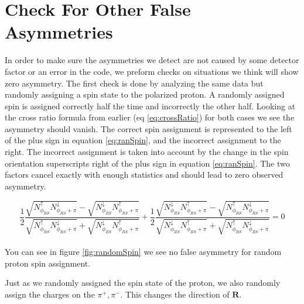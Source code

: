 \documentclass[abstract = on,listof=totoc, bibliography=totoc]{scrreprt}
\newcommand{\pip}{\pi^+}
\newcommand{\pim}{\pi^-}
\begin{document}
\section{Check For Other False Asymmetries}
In order to make sure the asymmetries we detect are not caused by some detector factor or an error in the code, we preform checks on situations we think will show zero asymmetry. The first check is done by analyzing the same data but randomly assigning a spin state to the polarized proton. A randomly assigned spin is assigned correctly half the time and incorrectly the other half. Looking at the cross ratio formula from earlier (eq \ref{eq:crossRatio}) for both cases we see the asymmetry should vanish. The correct spin assignment is represented to the left of the plus sign in equation \ref{eq:ranSpin}, and the incorrect assignment to the right. The incorrect assignment is taken into account by the change in the spin orientation superscripts right of the plus sign in equation \ref{eq:ranSpin}. The two factors cancel exactly with enough statistics and should lead to zero observed asymmetry. 

    

 
\begin{equation}
\label{eq:ranSpin}
\frac{1}{2}\frac{\sqrt{N^\uparrow_{\phi_{RS}}N^\downarrow_{\phi_{RS}+\pi}} - \sqrt{N^\downarrow_{\phi_{RS}}N^\uparrow_{\phi_{RS}+\pi}}}{\sqrt{N^\uparrow_{\phi_{RS}}N^\downarrow_{\phi_{RS}+\pi}} + \sqrt{N^\downarrow_{\phi_{RS}}N^\uparrow_{\phi_{RS}+\pi}}}
+
\frac{1}{2}\frac{\sqrt{N^\downarrow_{\phi_{RS}}N^\uparrow_{\phi_{RS}+\pi}} - \sqrt{N^\uparrow_{\phi_{RS}}N^\downarrow_{\phi_{RS}+\pi}}}{\sqrt{N^\downarrow_{\phi_{RS}}N^\uparrow_{\phi_{RS}+\pi}} + \sqrt{N^\uparrow_{\phi_{RS}}N^\downarrow_{\phi_{RS}+\pi}}} = 0
\end{equation}\\
%
You can see in figure \ref{fig:randomSpin} we see no false asymmetry for random proton spin assignment. 

Just as we randomly assigned the spin state of the proton, we also randomly assign the charges on the $\pip,\pim$. This changes the direction of $\bm{R}$. 
\end{document}

